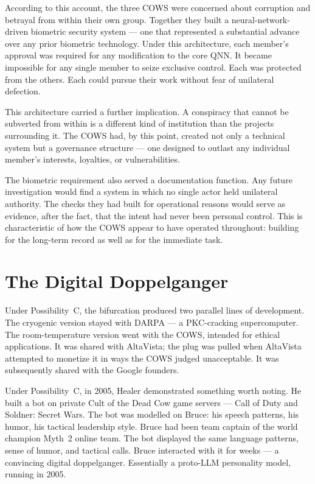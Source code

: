 According to this account, the three COWS were concerned about corruption and betrayal from within their own group. Together they built a neural-network-driven biometric security system --- one that represented a substantial advance over any prior biometric technology. Under this architecture, each member's approval was required for any modification to the core QNN. It became impossible for any single member to seize exclusive control. Each was protected from the others. Each could pursue their work without fear of unilateral defection.

This architecture carried a further implication. A conspiracy that cannot be subverted from within is a different kind of institution than the projects surrounding it. The COWS had, by this point, created not only a technical system but a governance structure --- one designed to outlast any individual member's interests, loyalties, or vulnerabilities.

The biometric requirement also served a documentation function. Any future investigation would find a system in which no single actor held unilateral authority. The checks they had built for operational reasons would serve as evidence, after the fact, that the intent had never been personal control. This is characteristic of how the COWS appear to have operated throughout: building for the long-term record as well as for the immediate task.

\section*{The Digital Doppelganger}
\label{pos18:the-digital-doppelganger}


Under Possibility~C, the bifurcation produced two parallel lines of development. The cryogenic version stayed with DARPA --- a PKC-cracking supercomputer. The room-temperature version went with the COWS, intended for ethical applications. It was shared with AltaVista; the plug was pulled when AltaVista attempted to monetize it in ways the COWS judged unacceptable. It was subsequently shared with the Google founders.

Under Possibility~C, in 2005, Healer demonstrated something worth noting. He built a bot on private Cult of the Dead Cow game servers --- Call of Duty and Soldner: Secret Wars. The bot was modelled on Bruce: his speech patterns, his humor, his tactical leadership style. Bruce had been team captain of the world champion Myth~2 online team. The bot displayed the same language patterns, sense of humor, and tactical calls. Bruce interacted with it for weeks --- a convincing digital doppelganger. Essentially a proto-LLM personality model, running in 2005.

